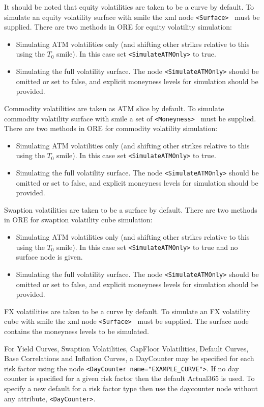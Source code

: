 It should be noted that equity volatilities are taken to be a curve by default. To simulate an equity volatility surface with smile the xml node {\tt <Surface> } must be supplied.
There are two methods in ORE for equity volatility simulation:
\begin{itemize}
\item Simulating ATM volatilities only (and shifting other strikes relative to this using the $T_{0}$ smile). In this case set {\tt <SimulateATMOnly>} to true.
\item Simulating the full volatility surface. The node {\tt <SimulateATMOnly>} should be omitted or set to false, and explicit moneyness levels for simulation should be provided.
\end{itemize}

Commodity volatilities are taken as ATM slice by default. To simulate commodity volatility surface with smile a set of {\tt <Moneyness> } must be supplied.
There are two methods in ORE for commodity volatility simulation:
\begin{itemize}
\item Simulating ATM volatilities only (and shifting other strikes relative to this using the $T_{0}$ smile). In this case set {\tt <SimulateATMOnly>} to true.
\item Simulating the full volatility surface. The node {\tt <SimulateATMOnly>} should be omitted or set to false, and explicit moneyness levels for simulation should be provided.
\end{itemize}

Swaption volatilities are taken to be a surface by default.
There are two methods in ORE for swaption volatility cube simulation:
\begin{itemize}
\item Simulating ATM volatilities only (and shifting other strikes relative to this using the $T_{0}$ smile). In this
  case set {\tt <SimulateATMOnly>} to true and no surface node is given.
\item Simulating the full volatility surface. The node {\tt <SimulateATMOnly>} should be omitted or set to false, and
  explicit moneyness levels for simulation should be provided.
\end{itemize}

FX volatilities are taken to be a curve by default. To simulate an FX volatility cube with smile the xml node {\tt <Surface> } must be supplied. The surface node contains the moneyness levels to be simulated.

For Yield Curves, Swaption Volatilities, CapFloor Volatilities, Default Curves, Base Correlations and Inflation Curves, a DayCounter may be specified for each risk factor using the node {\tt <DayCounter name="EXAMPLE\_CURVE">}.
If no day counter is specified for a given risk factor then the default Actual365 is used. To specify a new default for a risk factor type then use the daycounter node without any attribute,  {\tt <DayCounter>}.

